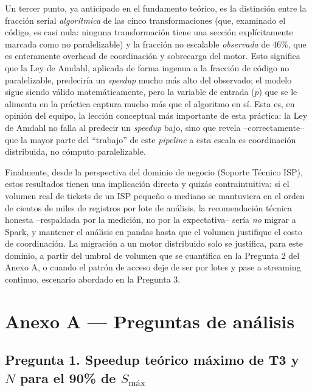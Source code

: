 \documentclass[11pt,a4paper]{article}
\begin{document}
    Un tercer punto, ya anticipado en el fundamento teórico, es la distinción entre la fracción
    serial \emph{algorítmica} de las cinco transformaciones (que, examinado el código, es casi nula:
    ninguna transformación tiene una sección explícitamente marcada como no paralelizable) y la
    fracción no escalable \emph{observada} de 46\%, que es enteramente overhead de coordinación y
    sobrecarga del motor. Esto significa que la Ley de Amdahl, aplicada de forma ingenua a la
    fracción de código no paralelizable, predeciría un \emph{speedup} mucho más alto del observado;
    el modelo sigue siendo válido matemáticamente, pero la variable de entrada ($p$) que se le
    alimenta en la práctica captura mucho más que el algoritmo en sí. Esta es, en opinión del
    equipo, la lección conceptual más importante de esta práctica: la Ley de Amdahl no falla al
    predecir un \emph{speedup} bajo, sino que revela --correctamente-- que la mayor parte del
    \enquote{trabajo} de este \emph{pipeline} a esta escala es coordinación distribuida, no cómputo
    paralelizable.

    Finalmente, desde la perspectiva del dominio de negocio (Soporte Técnico ISP), estos resultados
    tienen una implicación directa y quizás contraintuitiva: si el volumen real de tickets de un ISP
    pequeño o mediano se mantuviera en el orden de cientos de miles de registros por lote de
    análisis, la recomendación técnica honesta --respaldada por la medición, no por la expectativa--
    sería \emph{no} migrar a Spark, y mantener el análisis en pandas hasta que el volumen justifique
    el costo de coordinación. La migración a un motor distribuido solo se justifica, para este
    dominio, a partir del umbral de volumen que se cuantifica en la Pregunta 2 del Anexo A, o cuando
    el patrón de acceso deje de ser por lotes y pase a streaming continuo, escenario abordado en la
    Pregunta 3.

    \section{Anexo A --- Preguntas de análisis}
    \label{sec:preguntas-analisis}

    \subsection*{Pregunta 1. Speedup teórico máximo de T3 y \texorpdfstring{$N$}{N} para el 90\% de \texorpdfstring{$S_{\text{máx}}$}{Smax}}
\end{document}
